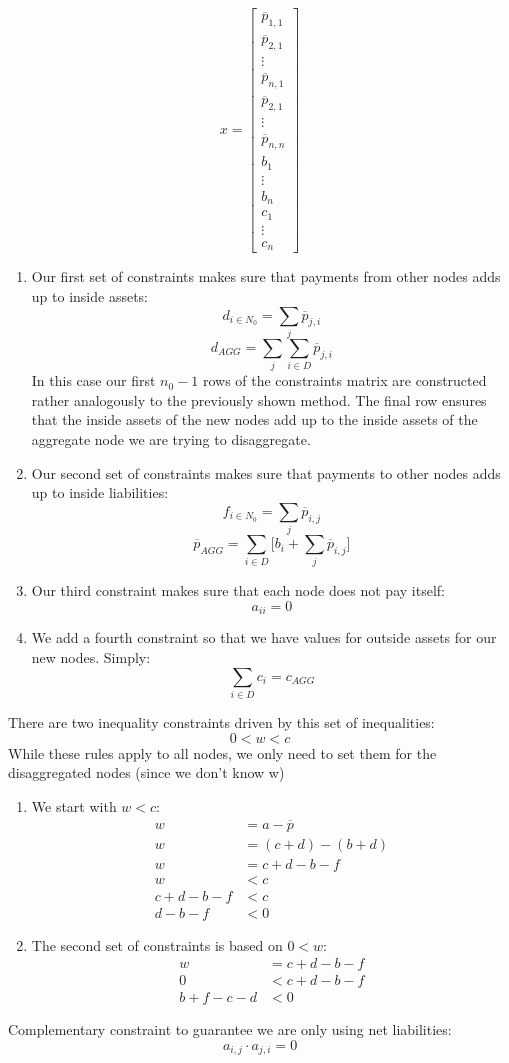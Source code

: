 \documentclass{article}
\newcommand{\?}{\stackrel{?}{=}}
\newcommand{\pbar}{\overline{p}}
\begin{document}
$$x= 
\begin{bmatrix}
\pbar_{1,1} \\
\pbar_{2,1} \\
\vdots \\
\pbar_{n,1} \\
\pbar_{2,1} \\
\vdots \\
\pbar_{n,n}\\
b_{1} \\
\vdots \\
b_n \\
c_1 \\
\vdots \\
c_n 
\end{bmatrix}
$$
\begin{enumerate}
\item Our first set of constraints makes sure that payments from other nodes adds up to inside assets:
$$d_{i\in N_0} = \sum_j \pbar_{j,i}$$
$$d_{AGG}=\sum_j\sum_{i\in D} \pbar_{j,i}$$
In this case our first $n_0-1$ rows of the constraints matrix are constructed rather analogously to the previously shown method. The final row ensures that the inside assets of the new nodes add up to the inside assets of the aggregate node we are trying to disaggregate. 

\item Our second set of constraints makes sure that payments to other nodes adds up to inside liabilities:
$$f_{i\in N_0}=\sum_j \pbar_{i,j}$$
$$\pbar_{AGG} = \sum_{i\in D}\big[b_i + \sum_j \pbar_{i,j}\big] $$
\item Our third constraint makes sure that each node does not pay itself:
$$a_{ii}=0$$
\item We add a fourth constraint so that we have values for outside assets for our new nodes. Simply:
$$\sum_{i\in D} c_i = c_{AGG}$$
\end{enumerate}
There are two inequality constraints driven by this set of inequalities:
$$0<w<c$$
While these rules apply to all nodes, we only need to set them for the disaggregated nodes (since we don't know w)
\begin{enumerate}
\item We start with $w<c$:
\begin{align*}
w&=a-\pbar \\
w&=(c+d)-(b+d)\\
w&=c+d-b-f \\
w&<c \\
c+d-b-f&<c \\
d-b-f&<0
\end{align*}
\item The second set of constraints is based on $0<w$:
\begin{align*}
w&=c+d-b-f \\
0&<c+d-b-f \\
b+f-c-d&<0
\end{align*}
\end{enumerate}
Complementary constraint to guarantee we are only using net liabilities:
$$a_{i,j}\cdot a_{j,i}=0$$
\end{document}

